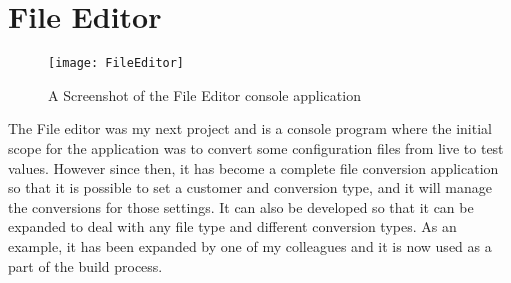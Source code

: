 \section{File Editor}{
	\begin{figure}
	\centering
	\texttt{[image: FileEditor]}
	\caption{A Screenshot of the File Editor console application}
	\label{fig:FileEditor}
	\end{figure}
	The File editor was my next project and is a console program where the initial scope for the application was to convert some configuration files from live to test values. However since then, it has become a complete file conversion application so that it is possible to set a customer and conversion type, and it will manage the conversions for those settings. It can also be developed so that it can be expanded to deal with any file type and different conversion types. As an example, it has been expanded by one of my colleagues and it is now used as a part of the build process.
}